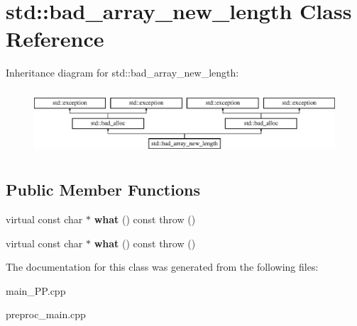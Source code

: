 \hypertarget{classstd_1_1bad__array__new__length}{\section{std\+:\+:bad\+\_\+array\+\_\+new\+\_\+length Class Reference}
\label{classstd_1_1bad__array__new__length}
}
Inheritance diagram for std\+:\+:bad\+\_\+array\+\_\+new\+\_\+length\+:\begin{figure}[H]
\begin{center}
\leavevmode
\includegraphics[height=2.441860cm]{classstd_1_1bad__array__new__length}
\end{center}
\end{figure}
\subsection*{Public Member Functions}
\begin{DoxyCompactItemize}
\item 
\hypertarget{classstd_1_1bad__array__new__length_a307382986113fbcc890a4a2154b5c890}{virtual const char $\ast$ {\bfseries what} () const   throw ()}\label{classstd_1_1bad__array__new__length_a307382986113fbcc890a4a2154b5c890}

\item 
\hypertarget{classstd_1_1bad__array__new__length_a307382986113fbcc890a4a2154b5c890}{virtual const char $\ast$ {\bfseries what} () const   throw ()}\label{classstd_1_1bad__array__new__length_a307382986113fbcc890a4a2154b5c890}

\end{DoxyCompactItemize}


The documentation for this class was generated from the following files\+:\begin{DoxyCompactItemize}
\item 
main\+\_\+\+P\+P.\+cpp\item 
preproc\+\_\+main.\+cpp\end{DoxyCompactItemize}
